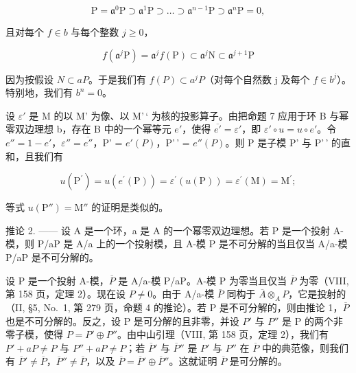 \[
\mathrm{P} = \mathfrak {a} ^ {0} \mathrm{P} \supset \mathfrak {a} ^ {1} \mathrm{P} \supset \dots \supset \mathfrak {a} ^ {n - 1} \mathrm{P} \supset \mathfrak {a} ^ {n} \mathrm{P} = 0,
\]

且对每个 \(f \in b\) 与每个整数 \(j \geqslant 0\)，

\[
f (\mathfrak {a} ^ {j} \mathrm{P}) = \mathfrak {a} ^ {j} f (\mathrm{P}) \subset \mathfrak {a} ^ {j} \mathrm{N} \subset \mathfrak {a} ^ {j + 1} \mathrm{P}
\]

因为按假设 \(N \subset aP\)。于是我们有 \(f(P) \subset a^{j}P\)（对每个自然数 j 及每个 \(f \in b^{j}\)）。特别地，我们有 \(b^{n} = 0\)。

设 \(\varepsilon'\) 是 M 的以 M' 为像、以 M'\,` 为核的投影算子。由把命题 7 应用于环 B 与幂零双边理想 b，存在 B 中的一个幂等元 \(e'\)，使得 \(\overline{e'} = \varepsilon'\)，即 \(\varepsilon' \circ u = u \circ e'\)。令 \(e'' = 1 - e'\)，\(\varepsilon'' = \overline{e''}\)，P' = \(e'(P)\)，P'\,' = \(e''(P)\)。则 P 是子模 P' 与 P'\,' 的直和，且我们有

\[
u (\mathrm{P} ^ {\prime}) = u (e ^ {\prime} (\mathrm{P})) = \varepsilon^ {\prime} (u (\mathrm{P})) = \varepsilon^ {\prime} (\mathrm{M}) = \mathrm{M} ^ {\prime};
\]

等式 \(u(\mathrm{P}'') = \mathrm{M}''\) 的证明是类似的。

推论 2. —— 设 A 是一个环，a 是 A 的一个幂零双边理想。若 P 是一个投射 A-模，则 P/aP 是 A/a 上的一个投射模，且 A-模 P 是不可分解的当且仅当 A/a-模 P/aP 是不可分解的。

设 P 是一个投射 A-模，\(\overline{P}\) 是 A/a-模 P/aP。A-模 P 为零当且仅当 \(\overline{P}\) 为零（VIII, 第 158 页，定理 2）。现在设 \(P \neq 0\)。由于 A/a-模 \(\overline{P}\) 同构于 \(\overline{A} \otimes_{A} P\)，它是投射的（II, §5, No.~1, 第 279 页，命题 4 的推论）。若 P 是不可分解的，则由推论 1，\(\overline{P}\) 也是不可分解的。反之，设 P 是可分解的且非零，并设 \(P'\) 与 \(P''\) 是 P 的两个非零子模，使得 \(P = P' \oplus P''\)。由中山引理（VIII, 第 158 页，定理 2），我们有 \(P' + aP \neq P\) 与 \(P'' + aP \neq P\)；若 \(\overline{P}'\) 与 \(\overline{P}''\) 是 \(P'\) 与 \(P''\) 在 \(\overline{P}\) 中的典范像，则我们有 \(\overline{P}' \neq \overline{P}\)，\(\overline{P}'' \neq \overline{P}\)，以及 \(\overline{P} = \overline{P}' \oplus \overline{P}''\)。这就证明 \(\overline{P}\) 是可分解的。
\relax{}
